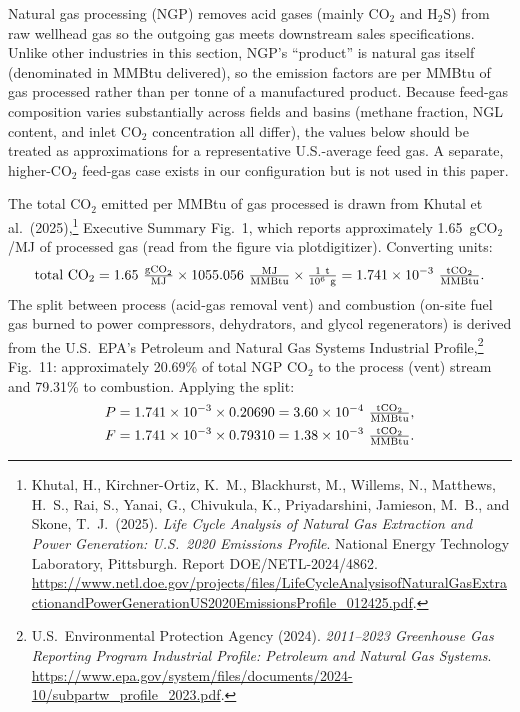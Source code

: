 \documentclass[11pt]{article}
\newcommand{\cotwo}{\ensuremath{\mathrm{CO_2}}}
\begin{document}
Natural gas processing (NGP) removes acid gases (mainly \cotwo{} and H$_2$S) from raw wellhead gas so the outgoing gas meets downstream sales specifications. Unlike other industries in this section, NGP's ``product'' is natural gas itself (denominated in MMBtu delivered), so the emission factors are per MMBtu of gas processed rather than per tonne of a manufactured product. Because feed-gas composition varies substantially across fields and basins (methane fraction, NGL content, and inlet \cotwo{} concentration all differ), the values below should be treated as approximations for a representative U.S.-average feed gas. A separate, higher-\cotwo{} feed-gas case exists in our configuration but is not used in this paper.

The total \cotwo{} emitted per MMBtu of gas processed is drawn from Khutal et al.\ (2025),\footnote{Khutal, H., Kirchner-Ortiz, K.~M., Blackhurst, M., Willems, N., Matthews, H.~S., Rai, S., Yanai, G., Chivukula, K., Priyadarshini, Jamieson, M.~B., and Skone, T.~J.\ (2025). \emph{Life Cycle Analysis of Natural Gas Extraction and Power Generation: U.S.\ 2020 Emissions Profile}. National Energy Technology Laboratory, Pittsburgh. Report DOE/NETL-2024/4862. \url{https://www.netl.doe.gov/projects/files/LifeCycleAnalysisofNaturalGasExtractionandPowerGenerationUS2020EmissionsProfile_012425.pdf}.} Executive Summary Fig.~1, which reports approximately 1.65~gCO$_2$/MJ of processed gas (read from the figure via plotdigitizer). Converting units:
%
\[
  \text{total }\cotwo{} = 1.65~\tfrac{\text{gCO}_2}{\text{MJ}} \times 1055.056~\tfrac{\text{MJ}}{\text{MMBtu}} \times \tfrac{1~\text{t}}{10^{6}~\text{g}} = 1.741 \times 10^{-3}~\tfrac{\text{t\cotwo{}}}{\text{MMBtu}}.
\]
%
The split between process (acid-gas removal vent) and combustion (on-site fuel gas burned to power compressors, dehydrators, and glycol regenerators) is derived from the U.S.\ EPA's Petroleum and Natural Gas Systems Industrial Profile,\footnote{U.S.\ Environmental Protection Agency (2024). \emph{2011--2023 Greenhouse Gas Reporting Program Industrial Profile: Petroleum and Natural Gas Systems}. \url{https://www.epa.gov/system/files/documents/2024-10/subpartw_profile_2023.pdf}.} Fig.~11: approximately 20.69\% of total NGP \cotwo{} to the process (vent) stream and 79.31\% to combustion. Applying the split:
%
\begin{align*}
  P &= 1.741 \times 10^{-3} \times 0.20690 = 3.60 \times 10^{-4}~\tfrac{\text{t\cotwo{}}}{\text{MMBtu}}, \\
  F &= 1.741 \times 10^{-3} \times 0.79310 = 1.38 \times 10^{-3}~\tfrac{\text{t\cotwo{}}}{\text{MMBtu}}.
\end{align*}
\end{document}
